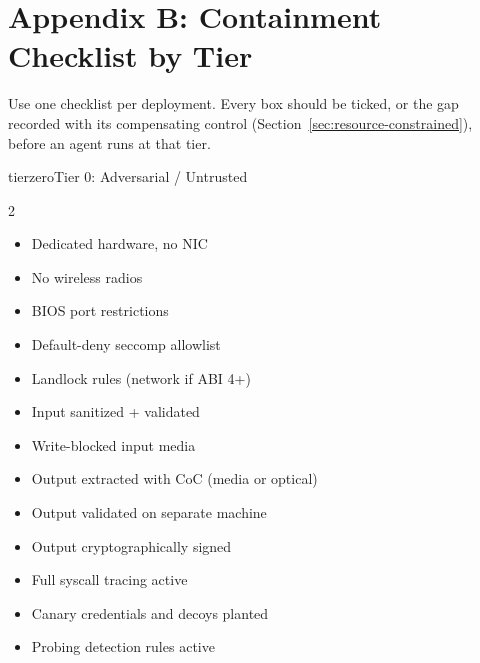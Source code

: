 \documentclass[11pt,letterpaper]{article}
\begin{document}
\section*{Appendix B: Containment Checklist by Tier}

Use one checklist per deployment. Every box should be ticked, or the gap recorded with its compensating control (Section~\ref{sec:resource-constrained}), before an agent runs at that tier.

\begin{checkbox}{tierzero}{Tier 0: Adversarial / Untrusted}
\small
\begin{multicols}{2}
\begin{itemize}[leftmargin=1.4em, itemsep=0.15em]
  \item[{\color{tierzero!80!black}$\square$}] Dedicated hardware, no NIC
  \item[{\color{tierzero!80!black}$\square$}] No wireless radios
  \item[{\color{tierzero!80!black}$\square$}] BIOS port restrictions
  \item[{\color{tierzero!80!black}$\square$}] Default-deny seccomp allowlist
  \item[{\color{tierzero!80!black}$\square$}] Landlock rules (network if ABI 4+)
  \item[{\color{tierzero!80!black}$\square$}] Input sanitized + validated
  \item[{\color{tierzero!80!black}$\square$}] Write-blocked input media
  \item[{\color{tierzero!80!black}$\square$}] Output extracted with CoC (media or optical)
  \item[{\color{tierzero!80!black}$\square$}] Output validated on separate machine
  \item[{\color{tierzero!80!black}$\square$}] Output cryptographically signed
  \item[{\color{tierzero!80!black}$\square$}] Full syscall tracing active
  \item[{\color{tierzero!80!black}$\square$}] Canary credentials and decoys planted
  \item[{\color{tierzero!80!black}$\square$}] Probing detection rules active

\end{itemize}
\end{multicols}
\end{checkbox}
\end{document}
